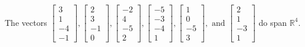 \begin{exercise}
\begin{exerciseStatement}
  \end{exerciseStatement}
  \begin{exerciseAnswer}
   The vectors \(\left[\begin{array}{r}
3 \\
1 \\
-4 \\
-1
\end{array}\right] , \left[\begin{array}{r}
2 \\
3 \\
-1 \\
0
\end{array}\right] , \left[\begin{array}{r}
-2 \\
4 \\
-5 \\
2
\end{array}\right] , \left[\begin{array}{r}
-5 \\
-3 \\
-4 \\
1
\end{array}\right] , \left[\begin{array}{r}
1 \\
0 \\
-5 \\
3
\end{array}\right] , \text{ and } \left[\begin{array}{r}
2 \\
1 \\
-3 \\
1
\end{array}\right]\) 
  	 do  
	span \(\mathbb{R}^4\).
  


  \end{exerciseAnswer}
\end{exercise}